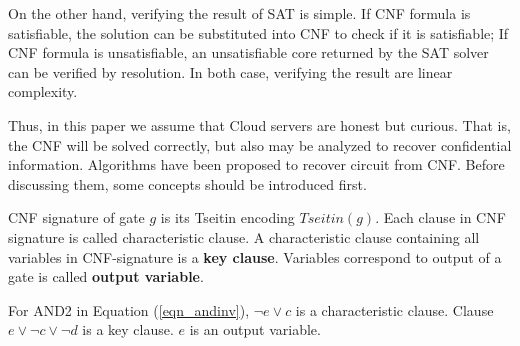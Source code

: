 \documentclass[runningheads,a4paper]{llncs}
\begin{document}
On the other hand,
verifying the result of SAT is simple.
If CNF formula is satisfiable, 
the solution can be substituted into CNF to check if it is satisfiable;
If CNF formula is unsatisfiable, 
an unsatisfiable core returned by the SAT solver can be verified by resolution.
In both case,
verifying the result are linear complexity.

Thus, in this paper we assume that Cloud servers are honest but curious.
That is,
the CNF will be solved correctly, 
but also may be analyzed to recover confidential information.
Algorithms \cite{t6,t7,t8,t9} have been proposed to recover circuit from CNF.
Before discussing them,
some concepts should be introduced first.  

\begin{definition}[CNF signature]
CNF signature of gate $g$ is its Tseitin encoding $Tseitin(g)$.
Each clause in CNF signature is called characteristic clause.
A characteristic clause containing all variables in CNF-signature is a \textbf{key clause}.
Variables correspond to output of a gate is called \textbf{output variable}.
\end{definition}


For AND2 in Equation (\ref{eqn_andinv}),
$\neg e\vee c$ is a characteristic clause. 
Clause $e\vee \neg c\vee\neg d$ is a key clause. 
$e$ is an output variable.


\end{document}
